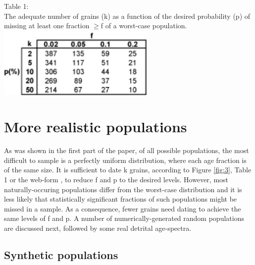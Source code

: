 \documentclass[12]{article}
\begin{document}
\setcounter{table}{1}
\begin{minipage}[c]{\textwidth}
 Table 1:\\  The adequate number  of grains (k)  as a function  of the
 desired probability  (p) of missing at  least one fraction  $\geq$f of a
 worst-case population.\\
 \includegraphics[width = 3in]{table1.jpg}
\label{tab:1}
\end{minipage}

 \section{More realistic populations}\label{sec:realistic}

As  was  shown  in the  first  part  of  the  paper, of  all  possible
populations,  the most  difficult  to sample  is  a perfectly  uniform
distribution,  where each age  fraction is  of the  same size.   It is
sufficient to date k grains,  according to Figure \ref{fig:3}, Table 1
or  the web-form  \cite{webform}, to  reduce f  and p  to  the desired
levels.  However, most  naturally-occuring populations differ from the
worst-case  distribution  and it  is  less  likely that  statistically
significant fractions of such populations might be missed in a sample.
As a consequence, fewer grains  need dating to achieve the same levels
of f and p.  A  number of numerically-generated random populations are
discussed next, followed by some real detrital age-spectra.\\

\subsection{Synthetic populations}\label{sec:numerical}
\end{document}
